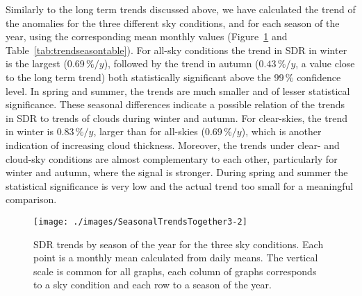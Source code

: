 \documentclass[applsci,article,submit,moreauthors,pdftex]{Definitions/mdpi}
\begin{document}
Similarly to the long term trends discussed above, we have calculated
the trend of the anomalies for the three different sky conditions, and
for each season of the year, using the corresponding mean monthly values
(Figure~\ref{fig:seasonalALL} and Table~\ref{tab:trendseasontable}). For
all-sky conditions the trend in SDR in winter is the largest
(\(0.69\,\%/y\)), followed by the trend in autumn (\(0.43\,\%/y\), a
value close to the long term trend) both statistically significant above
the \(99\,\%\) confidence level. In spring and summer, the trends are
much smaller and of lesser statistical significance. These seasonal
differences indicate a possible relation of the trends in SDR to trends
of clouds during winter and autumn. For clear-skies, the trend in winter
is \(0.83\,\%/y\), larger than for all-skies (\(0.69\,\%/y\)), which is
another indication of increasing cloud thickness. Moreover, the trends
under clear- and cloud-sky conditions are almost complementary to each
other, particularly for winter and autumn, where the signal is stronger.
During spring and summer the statistical significance is very low and
the actual trend too small for a meaningful comparison.

\begin{figure}[h!]

{\centering \texttt{[image: ./images/SeasonalTrendsTogether3-2]} 

}

\caption{SDR trends by season of the year for the three sky conditions. Each point is a monthly mean calculated from daily means. The vertical scale is common for all graphs, each column of graphs corresponds to a sky condition and each row to a season of the year.}\label{fig:seasonalALL}
\end{figure}
\end{document}
